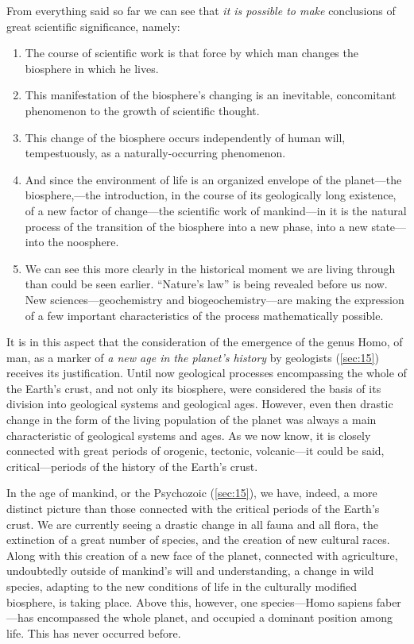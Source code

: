 \Section %
From everything said so far we can see that \emph{it is possible to make}
conclusions of great scientific significance, namely:
\begin{enumerate}
  \item The course of scientific work is that force by which man changes the
  	biosphere in which he lives.
  \item This manifestation of the biosphere's changing is an inevitable,
  	concomitant phenomenon to the growth of scientific thought.
  \item This change of the biosphere occurs independently of human will,
  	tempestuously, as a naturally-occurring phenomenon.
  \item And since the environment of life is an organized envelope of the
  	planet---the biosphere,---the introduction, in the course of its
	geologically long existence, of a new factor of change---the scientific
	work of mankind---in it is the natural process of the transition of the
	biosphere into a new phase, into a new state---into the noosphere.
  \item We can see this more clearly in the historical moment we are living
  	through than could be seen earlier.  ``Nature's law'' is being revealed
	before us now.  New sciences---geochemistry and biogeochemistry---are
	making the expression of a few important characteristics of the process
	mathematically possible.
\end{enumerate}


\Section %
It is in this aspect that the consideration of the emergence of the genus Homo,
of man, as a marker of \emph{a new age in the planet's history} by geologists
(\autoref{sec:15}) receives its justification.  Until now geological processes
encompassing the whole of the Earth's crust, and not only its biosphere, were
considered the basis of its division into geological systems and geological
ages.  However, even then drastic change in the form of the living population
of the planet was always a main characteristic of geological systems and ages.
As we now know, it is closely connected with great periods of orogenic,
tectonic, volcanic---it could be said, critical---periods of the history of the
Earth's crust.

In the age of mankind, or the Psychozoic (\autoref{sec:15}), we have, indeed, a
more distinct picture than those connected with the critical periods of the
Earth's crust.  We are currently seeing a drastic change in all fauna and all
flora, the extinction of a great number of species, and the creation of new
cultural races.  Along with this creation of a new face of the planet,
connected with agriculture, undoubtedly outside of mankind's will and
understanding, a change in wild species, adapting to the new conditions of life
in the culturally modified biosphere, is taking place.  Above this, however,
one species---Homo sapiens faber---has encompassed the whole planet, and
occupied a dominant position among life.  This has never occurred before.

